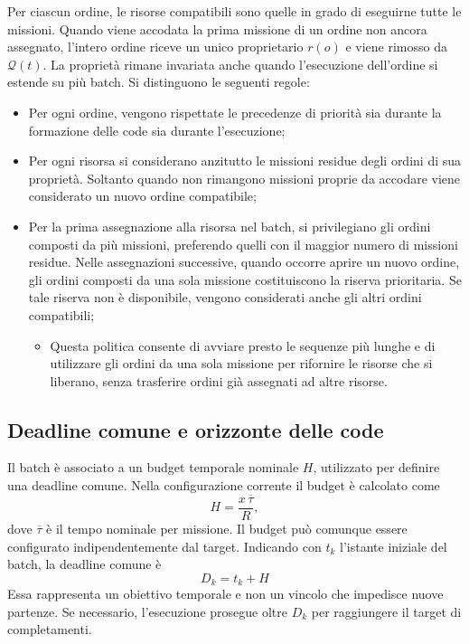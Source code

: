 Per ciascun ordine, le risorse compatibili sono quelle
in grado di eseguirne tutte le missioni. Quando viene
accodata la prima missione di un ordine non ancora
assegnato, l'intero ordine riceve un unico proprietario
$r(o)$ e viene rimosso da $\mathcal{Q}(t)$.
La proprietà rimane invariata anche quando l'esecuzione
dell'ordine si estende su più batch. Si distinguono le seguenti regole:
\begin{itemize}
	\item Per ogni ordine, vengono rispettate le precedenze di priorità
	sia durante la formazione delle code sia durante
	l'esecuzione;
	\item Per ogni risorsa si considerano anzitutto le missioni
	residue degli ordini di sua proprietà. Soltanto quando
	non rimangono missioni proprie da accodare viene
	considerato un nuovo ordine compatibile;
	\item Per la prima assegnazione alla risorsa nel batch,
	si privilegiano gli ordini composti da più missioni,
	preferendo quelli con il maggior numero di missioni
	residue. Nelle assegnazioni successive, quando occorre
	aprire un nuovo ordine, gli ordini composti da una sola
	missione costituiscono la riserva prioritaria.
	Se tale riserva non è disponibile, vengono considerati
	anche gli altri ordini compatibili;
	\begin{itemize}
		\item Questa politica consente di avviare presto le sequenze
		più lunghe e di utilizzare gli ordini da una sola missione
		per rifornire le risorse che si liberano, senza trasferire
		ordini già assegnati ad altre risorse.
	\end{itemize}
\end{itemize}


\subsection{Deadline comune e orizzonte delle code}

Il batch è associato a un budget temporale nominale $H$,
utilizzato per definire una deadline comune.
Nella configurazione corrente il budget è calcolato come
\begin{equation}
	H=\frac{x\,\overline{\tau}}{R},
	\label{eq:budget_temporale_batch}
\end{equation}
dove $\overline{\tau}$ è il tempo nominale per missione. Il budget può comunque essere configurato
indipendentemente dal target. Indicando con $t_k$ l'istante iniziale del batch,
la deadline comune è
\begin{equation}
	D_k=t_k+H
\end{equation}
Essa rappresenta un obiettivo temporale e non un vincolo
che impedisce nuove partenze. Se necessario,
l'esecuzione prosegue oltre $D_k$ per raggiungere
il target di completamenti.

